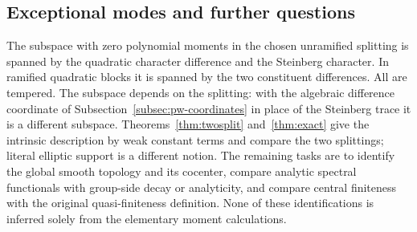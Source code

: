 \subsection{Exceptional modes and further questions}
The subspace with zero polynomial moments in the chosen unramified splitting is spanned by the quadratic character difference and the Steinberg character. In ramified quadratic blocks it is spanned by the two constituent differences. All are tempered. The subspace depends on the splitting: with the algebraic difference coordinate of Subsection~\ref{subsec:pw-coordinates} in place of the Steinberg trace it is a different subspace. Theorems~\ref{thm:twosplit} and~\ref{thm:exact} give the intrinsic description by weak constant terms and compare the two splittings; literal elliptic support is a different notion. The remaining tasks are to identify the global smooth topology and its cocenter, compare analytic spectral functionals with group-side decay or analyticity, and compare central finiteness with the original quasi-finiteness definition. None of these identifications is inferred solely from the elementary moment calculations.
